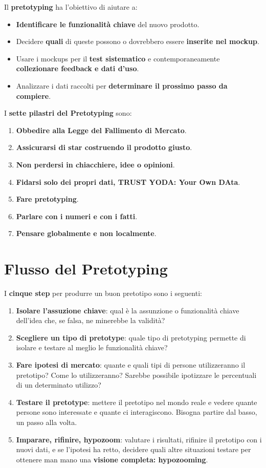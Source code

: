Il \textbf{pretotyping} ha l'obiettivo di aiutare a:

\begin{itemize}
	\item \textbf{Identificare le funzionalità chiave} del nuovo prodotto.
	\item Decidere \textbf{quali} di queste possono o dovrebbero essere \textbf{inserite nel mockup}.
	\item Usare i mockups per il \textbf{test sistematico} e contemporaneamente \textbf{collezionare feedback e dati d'uso}.
	\item Analizzare i dati raccolti per \textbf{determinare il prossimo passo da compiere}.
\end{itemize}

I \textbf{sette pilastri del Pretotyping} sono:

\begin{enumerate}
	\item \textbf{Obbedire alla Legge del Fallimento di Mercato}.
	\item \textbf{Assicurarsi di star costruendo il prodotto giusto}.
	\item \textbf{Non perdersi in chiacchiere, idee o opinioni}.
	\item \textbf{Fidarsi solo dei propri dati, \textbf{TRUST YODA: Your Own DAta}}.
	\item \textbf{Fare pretotyping}.
	\item \textbf{Parlare con i numeri e con i fatti}.
	\item \textbf{Pensare globalmente e non localmente}.
\end{enumerate}

\section{Flusso del Pretotyping}

I \textbf{cinque step} per produrre un buon pretotipo sono i seguenti:

\begin{enumerate}
	\item \textbf{Isolare l'assuzione chiave}: qual è la assunzione o funzionalità chiave dell'idea che, se falsa, ne minerebbe la validità?
	\item \textbf{Scegliere un tipo di pretotype}: quale tipo di pretotyping permette di isolare e testare al meglio le funzionalità chiave?
	\item \textbf{Fare ipotesi di mercato}: quante e quali tipi di persone utilizzeranno il pretotipo? Come lo utilizzeranno? Sarebbe possibile ipotizzare le percentuali di un determinato utilizzo?
	\item \textbf{Testare il pretotype}: mettere il pretotipo nel mondo reale e vedere quante persone sono interessate e quante ci interagiscono. Bisogna partire dal basso, un passo alla volta.
	\item \textbf{Imparare, rifinire, hypozoom}: valutare i risultati, rifinire il pretotipo con i nuovi dati, e se l'ipotesi ha retto, decidere quali altre situazioni testare per ottenere man mano una \textbf{visione completa: hypozooming}.
\end{enumerate}

